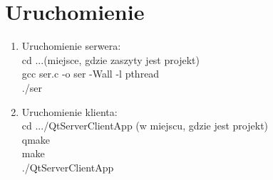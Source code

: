 \documentclass[12pt]{article}
\begin{document}
\section{Uruchomienie}
\begin{enumerate}
	\item Uruchomienie serwera:\\
		cd ...(miejsce, gdzie zaszyty jest projekt)\\
		gcc ser.c -o ser -Wall -l pthread\\
		./ser
	\item Uruchomienie klienta:\\
		cd .../QtServerClientApp (w miejscu, gdzie jest projekt)\\
		qmake\\
		make\\
		./QtServerClientApp
		
\end{enumerate}
\end{document}

